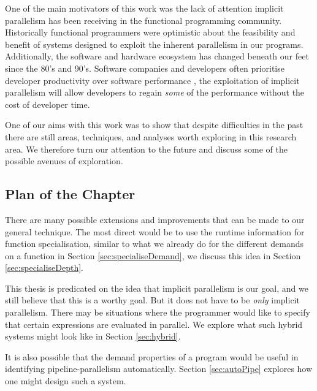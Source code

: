 One of the main motivators of this work was the lack of attention implicit
parallelism has been receiving in the functional programming community.
Historically functional programmers were optimistic about the feasibility and
benefit of systems designed to exploit the inherent parallelism in our
programs.  Additionally, the software and hardware ecosystem has changed
beneath our feet since the 80's and 90's. Software companies and developers
often prioritise developer productivity over software performance
\citep{codingHorror}, the exploitation of implicit parallelism will allow
developers to regain \emph{some} of the performance without the cost of
developer time.

One of our aims with this work was to show that despite difficulties in the
past there are still areas, techniques, and analyses worth exploring in this
research area.  We therefore turn our attention to the future and discuss some
of the possible avenues of exploration.

\subsection*{Plan of the Chapter}

There are many possible extensions and improvements that can be made to our
general technique. The most direct would be to use the runtime information for
function specialisation, similar to what we already do for the different
demands on a function in Section \ref{sec:specialiseDemand}, we discuss this
idea in Section \ref{sec:specialiseDepth}.

This thesis is predicated on the idea that implicit parallelism is our goal, and
we still believe that this is a worthy goal. But it does not have to be \emph{only}
implicit parallelism. There may be situations where the programmer would like to
specify that certain expressions are evaluated in parallel. We explore what such
hybrid systems might look like in Section \ref{sec:hybrid}.

It is also possible that the demand properties of a program would be useful in
identifying pipeline-parallelism automatically. Section \ref{sec:autoPipe}
explores how one might design such a system. 
